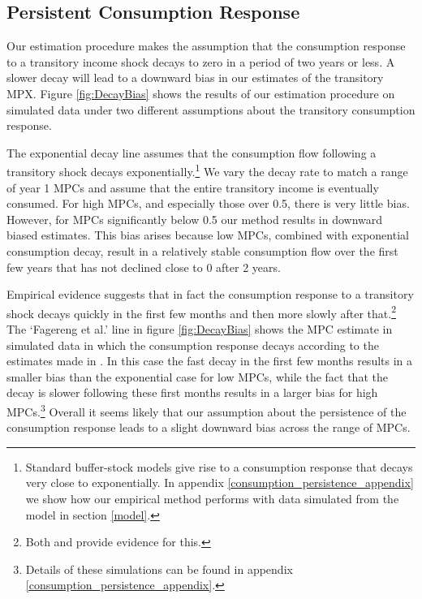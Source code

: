 \documentclass[titlepage]{\econtex}\newcommand{\texname}{ConsumptionHeterogeneity}
\begin{document}
\subsection{Persistent Consumption Response} \label{Consumption_persistence}
Our estimation procedure makes the assumption that the consumption response to a transitory income shock decays to zero in a period of two years or less. A slower decay will lead to a downward bias in our estimates of the transitory MPX. Figure \ref{fig:DecayBias} shows the results of our estimation procedure on simulated data under two different assumptions about the transitory consumption response.

The exponential decay line assumes that the consumption flow following a transitory shock decays exponentially.\footnote{Standard buffer-stock models give rise to a consumption response that decays very close to exponentially. In appendix \ref{consumption_persistence_appendix} we show how our empirical method performs with data simulated from the model in section \ref{model}.} We vary the decay rate to match a range of year 1 MPCs and assume that the entire transitory income is eventually consumed. For high MPCs, and especially those over 0.5, there is very little bias. However, for MPCs significantly below 0.5 our method results in downward biased estimates. This bias arises because low MPCs, combined with exponential consumption decay, result in a relatively stable consumption flow over the first few years that has not declined close to 0 after 2 years.

Empirical evidence suggests that in fact the consumption response to a transitory shock decays quickly in the first few months and then more slowly after that.\footnote{Both \cite{fagereng_mpc_2016} and \cite{gelman_what_2016} provide evidence for this.} The `Fagereng et al.' line in figure \ref{fig:DecayBias} shows the MPC estimate in simulated data in which the consumption response decays according to the estimates made in \cite{fagereng_mpc_2016}. In this case the fast decay in the first few months results in a smaller bias than the exponential case for low MPCs, while the fact that the decay is slower following these first months results in a larger bias for high MPCs.\footnote{Details of these simulations can be found in appendix \ref{consumption_persistence_appendix}.} Overall it seems likely that our assumption about the persistence of the consumption response leads to a slight downward bias across the range of MPCs.
\end{document}

